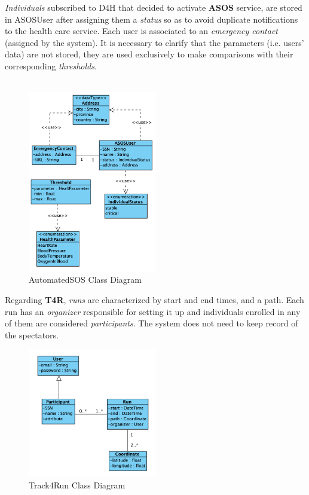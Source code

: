\documentclass[a4paper, hidelinks, 12pt]{report}
\begin{document}
	\textit{Individuals} subscribed to D4H that decided to activate \textbf{ASOS} service, are stored in ASOSUser after assigning them a \textit{status} so as to avoid duplicate notifications to the health care service. Each user is associated to an \textit{emergency contact} (assigned by the system). It is necessary to clarify that the parameters (i.e. users' data) are not stored, they are used exclusively to make comparisons with their corresponding  \textit{thresholds}.\\\\
	
	\begin{figure}[H]
    		\centering
		\includegraphics[width=0.5\textwidth]{diagrams/asos_class_diagram.png}
		\caption[AutomatedSOS Class Diagram]{AutomatedSOS Class Diagram}
		\label{fig:AutomatedSOS Class Diagram}
	\end{figure}
	
	Regarding \textbf{T4R}, \textit{runs} are characterized by start and end times, and a path. Each run has an \textit{organizer} responsible for setting it up and individuals enrolled in any of them are considered \textit{participants}. The system does not need to keep record of the spectators.
	
	\begin{figure}[H]
    		\centering
		\includegraphics[width=0.5\textwidth]{diagrams/t4r_class_diagram.png}
		\caption[Track4Run Class Diagram]{Track4Run Class Diagram}
		\label{fig:Track4Run Class Diagram}
	\end{figure}		
			
\end{document}
